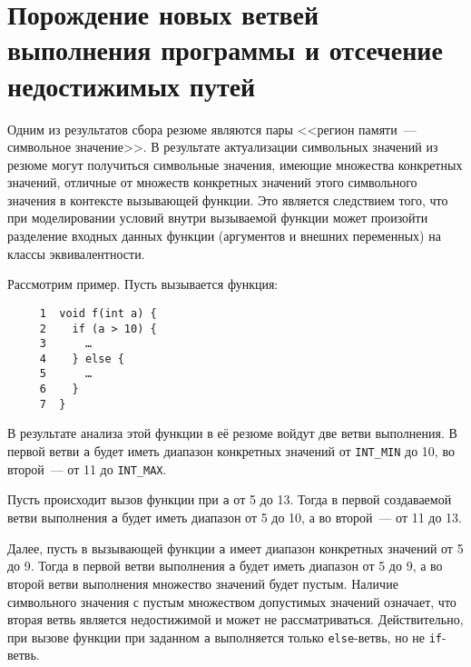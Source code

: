 \section{Порождение новых ветвей выполнения программы и отсечение недостижимых путей}

Одним из результатов сбора резюме являются пары <<регион памяти~--- символьное значение>>. В результате актуализации символьных значений из резюме могут получиться символьные значения, имеющие множества конкретных значений, отличные от множеств конкретных значений этого символьного значения в контексте вызывающей функции. Это является следствием того, что при моделировании условий внутри вызываемой функции может произойти разделение входных данных функции (аргументов и внешних переменных) на классы эквивалентности.

Рассмотрим пример. Пусть вызывается функция:

\begin{verbatim}
     1  void f(int a) {
     2    if (a > 10) {
     3      …
     4    } else {
     5      …
     6    }
     7  }
\end{verbatim}

В результате анализа этой функции в её резюме войдут две ветви выполнения. В первой ветви \texttt{a} будет иметь диапазон конкретных значений от \texttt{INT\_MIN} до 10, во второй~--- от 11 до \texttt{INT\_MAX}.

Пусть происходит вызов функции при \texttt{a} от 5 до 13. Тогда в первой создаваемой ветви выполнения \texttt{а} будет иметь диапазон от 5 до 10, а во второй~--- от 11 до 13.

Далее, пусть в вызывающей функции \texttt{a} имеет диапазон конкретных значений от 5 до 9. Тогда в первой ветви выполнения \texttt{a} будет иметь диапазон от 5 до 9, а во второй ветви выполнения множество значений будет пустым. Наличие символьного значения с пустым множеством допустимых значений означает, что вторая ветвь является недостижимой и может не рассматриваться. Действительно, при вызове функции при заданном \texttt{а} выполняется только \texttt{else}-ветвь, но не \texttt{if}-ветвь.

